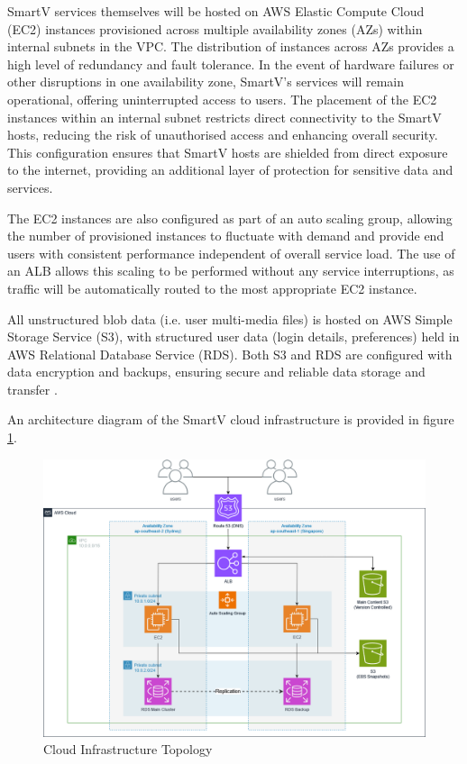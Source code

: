 SmartV services themselves will be hosted on AWS Elastic Compute Cloud (EC2) instances provisioned across multiple availability zones (AZs) within internal subnets in the VPC. The distribution of instances across AZs provides a high level of redundancy and fault tolerance. In the event of hardware failures or other disruptions in one availability zone, SmartV's services will remain operational, offering uninterrupted access to users. The placement of the EC2 instances within an internal subnet restricts direct connectivity to the SmartV hosts, reducing the risk of unauthorised access and enhancing overall security. This configuration ensures that SmartV hosts are shielded from direct exposure to the internet, providing an additional layer of protection for sensitive data and services.

The EC2 instances are also configured as part of an auto scaling group, allowing the number of provisioned instances to fluctuate with demand and provide end users with consistent performance independent of overall service load. The use of an ALB allows this scaling to be performed without any service interruptions, as traffic will be automatically routed to the most appropriate EC2 instance.


All unstructured blob data (i.e. user multi-media files) is hosted on AWS Simple Storage Service (S3), with structured user data (login details, preferences) held in AWS Relational Database Service (RDS). Both S3 and RDS are configured with data encryption and backups, ensuring secure and reliable data storage and transfer \parencite{amazonwebservicesEncryptingAmazonRDS2023, amazonwebservicesProtectingDataEncryption}.

An architecture diagram of the SmartV cloud infrastructure is provided in figure \ref{fig:awsdiagram}.

\begin{figure}[h]
    \centering
    \includegraphics[width=\textwidth]{cci_aws}
    \caption{Cloud Infrastructure Topology}
    \label{fig:awsdiagram}
\end{figure}


